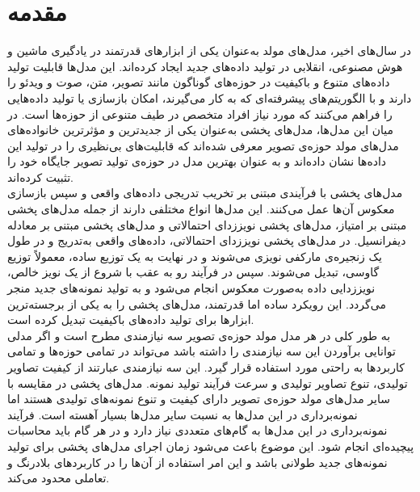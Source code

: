 \chapter{مقدمه}


در سال‌های اخیر، مدل‌های مولد به‌عنوان یکی از ابزارهای قدرتمند در یادگیری ماشین و هوش مصنوعی، انقلابی در تولید داده‌های جدید ایجاد کرده‌اند. این مدل‌ها قابلیت تولید داده‌های متنوع و باکیفیت در حوزه‌های گوناگون مانند تصویر، متن، صوت و ویدئو را دارند و با الگوریتم‌های پیشرفته‌ای که به کار می‌گیرند، امکان بازسازی یا تولید داده‌هایی را فراهم می‌کنند که مورد نیاز افراد متخصص در طیف متنوعی از حوزه‌ها است. در میان این مدل‌ها، مدل‌های پخشی  به‌عنوان یکی از جدیدترین و مؤثرترین خانواده‌های مدل‌های مولد حوزه‌ی تصویر معرفی شده‌اند که قابلیت‌های بی‌نظیری را در تولید این داده‌ها نشان داده‌اند و به عنوان بهترین مدل در حوزه‌ی تولید تصویر جایگاه خود را تثبیت کرده‌اند.
\\

مدل‌های پخشی با فرآیندی مبتنی بر تخریب تدریجی داده‌های واقعی و سپس بازسازی معکوس آن‌ها عمل می‌کنند. این مدل‌ها انواع مختلفی دارند از جمله مدل‌های پخشی مبتنی بر امتیاز، مدل‌های پخشی نویززدای احتمالاتی و مد‌ل‌های پخشی مبتنی بر معادله دیفرانسیل. در مدل‌های پخشی نویززدای احتمالاتی، داده‌های واقعی به‌تدریج و در طول یک زنجیره‌ی مارکفی نویزی می‌شوند و در نهایت به یک توزیع ساده، معمولاً توزیع گاوسی، تبدیل می‌شوند. سپس در فرآیند رو به عقب با شروع از یک نویز خالص، نویززدایی داده‌ به‌صورت معکوس انجام می‌شود و به تولید نمونه‌های جدید منجر می‌گردد. این رویکرد ساده اما قدرتمند، مدل‌های پخشی را به یکی از برجسته‌ترین ابزارها برای تولید داده‌های باکیفیت تبدیل کرده است.  
\\

به طور کلی در هر مدل مولد حوزه‌ی تصویر سه نیازمندی مطرح است و اگر مدلی توانایی برآوردن این سه نیازمندی را داشته باشد می‌تواند در تمامی حوزه‌ها و تمامی کاربردها به راحتی مورد استفاده قرار گیرد\cite{xiao2021tackling}. این سه نیازمندی عبارتند از کیفیت تصاویر تولیدی، تنوع تصاویر تولیدی و سرعت فرآیند تولید نمونه. مدل‌های پخشی در مقایسه با سایر مدل‌های مولد حوزه‌ی تصویر دارای کیفیت و تنوع نمونه‌های تولیدی هستند اما نمونه‌برداری در این مدل‌ها به نسبت سایر مدل‌ها بسیار آهسته است\cite{xiao2021tackling}. فرآیند نمونه‌برداری در این مدل‌ها به گام‌های متعددی نیاز دارد و در هر گام باید محاسبات پیچیده‌ای انجام شود. این موضوع باعث می‌شود زمان اجرای مدل‌های پخشی برای تولید نمونه‌های جدید طولانی باشد و این امر استفاده از آن‌ها را در کاربردهای بلادرنگ و تعاملی محدود می‌کند.
\\

